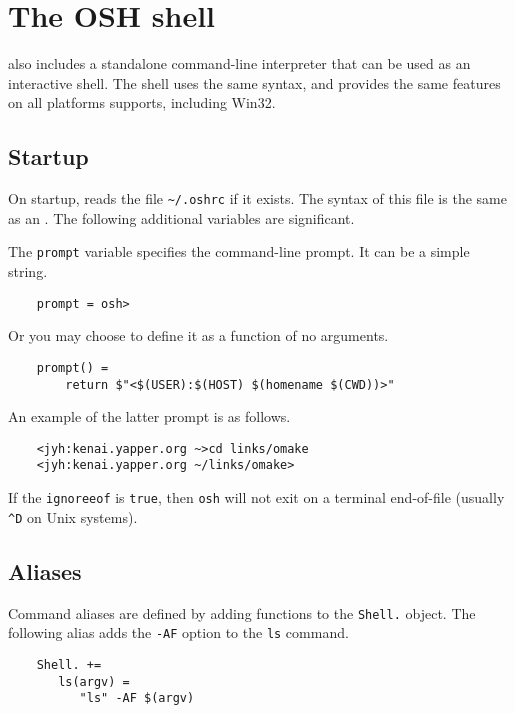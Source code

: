 %
%
%
\chapter{The OSH shell}
\label{chapter:osh}

\OMake{} also includes a standalone command-line interpreter  that can be used as an
interactive shell.  The shell uses the same syntax, and provides the same features on all platforms
 supports, including Win32.

\section{Startup}

On startup,  reads the file \verb+~/.oshrc+ if it exists.  The syntax of this file is the
same as an .  The following additional variables are significant.

  The \verb+prompt+ variable specifies the command-line prompt.
It can be a simple string.

\begin{verbatim}
    prompt = osh>
\end{verbatim}

Or you may choose to define it as a function of no arguments.

\begin{verbatim}
    prompt() =
        return $"<$(USER):$(HOST) $(homename $(CWD))>"
\end{verbatim}

An example of the latter prompt is as follows.

\begin{verbatim}
    <jyh:kenai.yapper.org ~>cd links/omake
    <jyh:kenai.yapper.org ~/links/omake>
\end{verbatim}

   If the \verb+ignoreeof+ is \verb+true+, then \verb+osh+ will not exit on
   a terminal end-of-file (usually \verb+^D+ on Unix systems).

\section{Aliases}

Command aliases are defined by adding functions to the \verb+Shell.+ object.  The following alias
adds the \verb+-AF+ option to the \verb+ls+ command.

\begin{verbatim}
    Shell. +=
       ls(argv) =
          "ls" -AF $(argv)
\end{verbatim}

